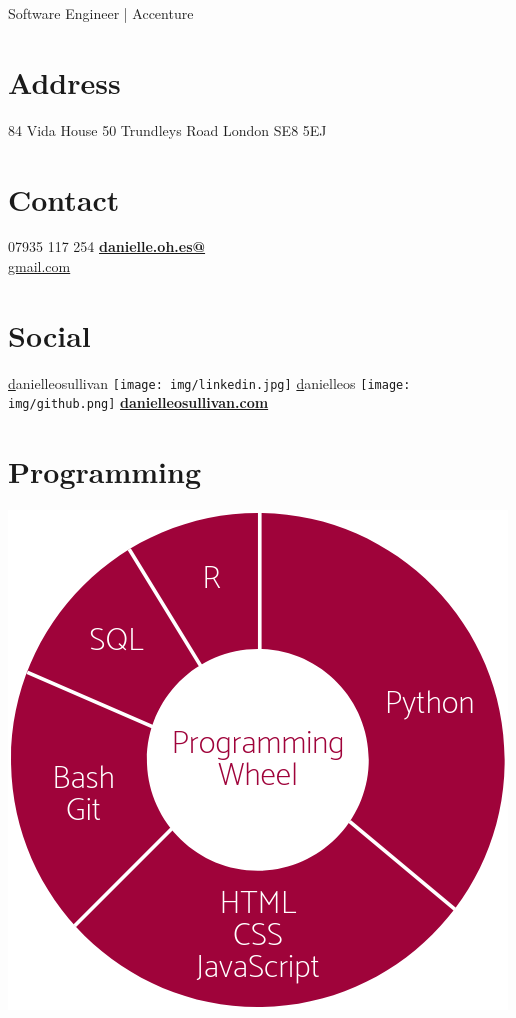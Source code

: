 \documentclass[]{friggeri-cv}
\begin{document}
      {\-\hspace{-1.9cm} Software Engineer | Accenture}
      

\begin{aside}
    \section{Address}
        84 Vida House
        50 Trundleys Road
        London
        SE8 5EJ
    ~
    \section{Contact}
        07935 117 254
        \href{mailto:danielle.oh.es@gmail.com}{\textbf{danielle.oh.es@}\\gmail.com}
    ~
    \section{Social}
        \href{https://www.linkedin.com/in/danielleosullivan}danielleosullivan {\texttt{[image: img/linkedin.jpg]}}
        \href{https://github.com/danielleos}danielleos {\texttt{[image: img/github.png]}}
        \href{http://danielleosullivan.com}{\textbf{danielleosullivan.com}}
    ~
    \section{Programming}
        \includegraphics[scale=0.25]{img/programmingwheel.png}
    ~

\end{aside}
\end{document}
